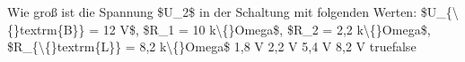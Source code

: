     {Wie groß ist die Spannung \$U\_2\$ in der Schaltung mit folgenden Werten: \$U\_\{\textbackslash\{\}textrm\{B\}\} = 12 V\$, \$R\_1 = 10 k\textbackslash\{\}Omega\$, \$R\_2 = 2,2 k\textbackslash\{\}Omega\$, \$R\_\{\textbackslash\{\}textrm\{L\}\} = 8,2 k\textbackslash\{\}Omega\$}
    {1,8 V}
    {2,2 V}
    {5,4 V}
    {8,2 V}
    {true}{false}